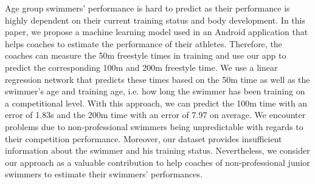 Age group swimmers' performance is hard to predict as their performance is highly dependent on their current training status and body development. In this paper, we propose a machine learning model used in an Android application that helps coaches to estimate the performance of their athletes. Therefore, the coaches can measure the 50m freestyle times in training and use our app to predict the corresponding 100m and 200m freestyle time. We use a linear regression network that predicts these times based on the 50m time as well as the swimmer's age and training age, i.e. how long the swimmer has been training on a competitional level. With this approach, we can predict the 100m time with an error of 1.83s and the 200m time with an error of 7.97 on average. We encounter problems due to non-professional swimmers being unpredictable with regards to their competition performance. Moreover, our dataset provides insufficient information about the swimmer and his training status. Nevertheless, we consider our approach as a valuable contribution to help coaches of non-professional junior swimmers to estimate their swimmers' performances.